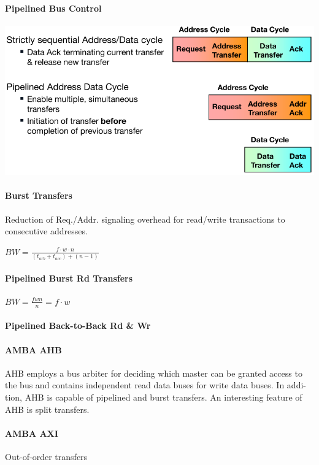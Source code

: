 \documentclass[english]{latex4ei/latex4ei_sheet}
\begin{document}
\paragraph{Pipelined Bus Control}
\begin{center}
	\centering
	\includegraphics[width=0.75\linewidth]{images//6.Interconnects/PipelinedBusControl.png}
\end{center}

\paragraph{Burst Transfers} Reduction of Req./Addr. signaling overhead for read/write transactions to consecutive addresses.

$BW = \frac{f \cdot w \cdot n}{(t_{arb} + t_{acc}) + (n - 1)}$
\paragraph{Pipelined Burst Rd Transfers}

$BW = \frac{f w n}{n} = f \cdot w$

\paragraph{Pipelined Back-to-Back Rd \& Wr}

\paragraph{AMBA AHB} AHB employs a bus arbiter for deciding which master can be granted
access to the bus and contains independent read data buses for write data buses. In addi-
tion, AHB is capable of pipelined and burst transfers. An interesting feature of AHB is split
transfers.

\paragraph{AMBA AXI} Out-of-order transfers
\end{document}
